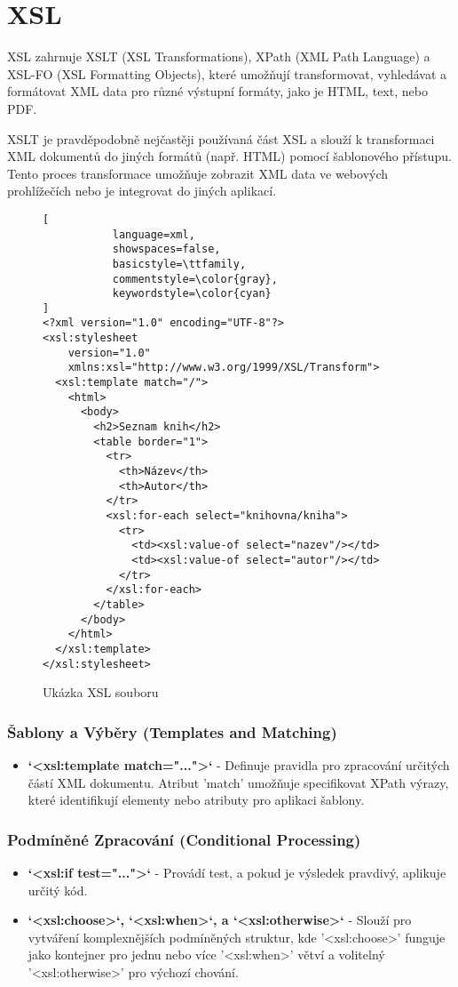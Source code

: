 \chapter{XSL}
\label{cha:XSL}
XSL zahrnuje XSLT (XSL Transformations), XPath (XML Path Language) a XSL-FO (XSL Formatting Objects), které umožňují transformovat, vyhledávat a formátovat XML data pro různé výstupní formáty, jako je HTML, text, nebo PDF.

XSLT je pravděpodobně nejčastěji používaná část XSL a slouží k transformaci XML dokumentů do jiných formátů (např. HTML) pomocí šablonového přístupu. Tento proces transformace umožňuje zobrazit XML data ve webových prohlížečích nebo je integrovat do jiných aplikací.
\begin{figure}[H]
\centering
\begin{lstlisting}[
           language=xml,
           showspaces=false,
           basicstyle=\ttfamily,
           commentstyle=\color{gray},
           keywordstyle=\color{cyan}
]
<?xml version="1.0" encoding="UTF-8"?>
<xsl:stylesheet 
    version="1.0" 
    xmlns:xsl="http://www.w3.org/1999/XSL/Transform">
  <xsl:template match="/">
    <html>
      <body>
        <h2>Seznam knih</h2>
        <table border="1">
          <tr>
            <th>Název</th>
            <th>Autor</th>
          </tr>
          <xsl:for-each select="knihovna/kniha">
            <tr>
              <td><xsl:value-of select="nazev"/></td>
              <td><xsl:value-of select="autor"/></td>
            </tr>
          </xsl:for-each>
        </table>
      </body>
    </html>
  </xsl:template>
</xsl:stylesheet>
\end{lstlisting}
\caption{Ukázka XSL souboru}
\label{fig:xsl_file}
\end{figure}

\subsection{Šablony a Výběry (Templates and Matching)}
\begin{itemize}
    \item \textbf{`<xsl:template match="...">`} - Definuje pravidla pro zpracování určitých částí XML dokumentu. Atribut 'match' umožňuje specifikovat XPath výrazy, které identifikují elementy nebo atributy pro aplikaci šablony.
\end{itemize}

\subsection{Podmíněné Zpracování (Conditional Processing)}
\begin{itemize}
    \item \textbf{`<xsl:if test="...">`} - Provádí test, a pokud je výsledek pravdivý, aplikuje určitý kód.
    \item \textbf{`<xsl:choose>`, `<xsl:when>`, a `<xsl:otherwise>`} - Slouží pro vytváření komplexnějších podmíněných struktur, kde '<xsl:choose>' funguje jako kontejner pro jednu nebo více '<xsl:when>' větví a volitelný '<xsl:otherwise>' pro výchozí chování.
\end{itemize}

